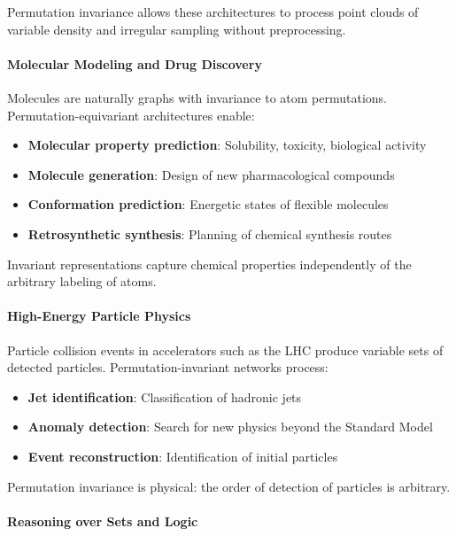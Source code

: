 Permutation invariance allows these architectures to process point clouds of variable density and irregular sampling without preprocessing.

\paragraph{Molecular Modeling and Drug Discovery}

Molecules are naturally graphs with invariance to atom permutations. Permutation-equivariant architectures enable:

\begin{itemize}
    \item \textbf{Molecular property prediction}: Solubility, toxicity, biological activity
    \item \textbf{Molecule generation}: Design of new pharmacological compounds
    \item \textbf{Conformation prediction}: Energetic states of flexible molecules
    \item \textbf{Retrosynthetic synthesis}: Planning of chemical synthesis routes
\end{itemize}

Invariant representations capture chemical properties independently of the arbitrary labeling of atoms.

\paragraph{High-Energy Particle Physics}

Particle collision events in accelerators such as the LHC produce variable sets of detected particles. Permutation-invariant networks process:

\begin{itemize}
    \item \textbf{Jet identification}: Classification of hadronic jets
    \item \textbf{Anomaly detection}: Search for new physics beyond the Standard Model
    \item \textbf{Event reconstruction}: Identification of initial particles
\end{itemize}

Permutation invariance is physical: the order of detection of particles is arbitrary.

\paragraph{Reasoning over Sets and Logic}

